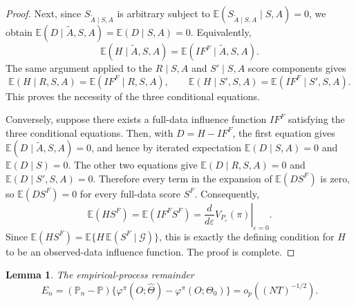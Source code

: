 \documentclass[12pt]{article}
\newcommand{\0}{\boldsymbol{0}}
\newtheorem{lemma}{Lemma}
\begin{document}
\begin{proof}
Next, since \(S_{\widetilde A\mid S,A}\) is arbitrary subject to \(\mathbb E(S_{\widetilde A\mid S,A}\mid S,A)=0\), we obtain \(\mathbb E(D\mid \widetilde A,S,A)=\mathbb E(D\mid S,A)=0\). Equivalently,
\[
\mathbb E(H\mid \widetilde A,S,A)=\mathbb E(IF^F\mid \widetilde A,S,A).
\]
The same argument applied to the \(R\mid S,A\) and \(S'\mid S,A\) score components gives
\[
\mathbb E(H\mid R,S,A)=\mathbb E(IF^F\mid R,S,A),
\qquad
\mathbb E(H\mid S',S,A)=\mathbb E(IF^F\mid S',S,A).
\]
This proves the necessity of the three conditional equations.

Conversely, suppose there exists a full-data influence function \(IF^F\) satisfying the three conditional equations. Then, with \(D=H-IF^F\), the first equation gives \(\mathbb E(D\mid \widetilde A,S,A)=0\), and hence by iterated expectation \(\mathbb E(D\mid S,A)=0\) and \(\mathbb E(D\mid S)=0\). The other two equations give \(\mathbb E(D\mid R,S,A)=0\) and \(\mathbb E(D\mid S',S,A)=0\). Therefore every term in the expansion of \(\mathbb E(DS^F)\) is zero, so \(\mathbb E(DS^F)=0\) for every full-data score \(S^F\). Consequently,
\[
\mathbb E(HS^F)=\mathbb E(IF^F S^F)=\left.\frac{d}{d\varepsilon}V_{P_\varepsilon}(\pi)\right|_{\varepsilon=0}.
\]
Since \(\mathbb E(HS^F)=\mathbb E\{H\,\mathbb E(S^F\mid \mathcal G)\}\), this is exactly the defining condition for \(H\) to be an observed-data influence function. The proof is complete.
\end{proof}

\begin{lemma} \label{lem:EP}
    The empirical-process remainder
\[
E_n=(\mathbb P_n-\mathbb P)\{\varphi^\pi(O;\widehat\Theta)-\varphi^\pi(O;\Theta_0)\}=o_p((NT)^{-1/2}).
\]
\end{lemma}
\end{document}
